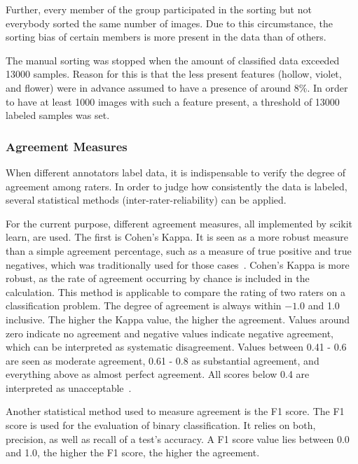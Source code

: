 Further, every member of the group participated in the sorting but not everybody sorted the same number of images. Due to this circumstance, the sorting bias of certain members is more present in the data than of others.

The manual sorting was stopped when the amount of classified data exceeded 13000 samples. Reason for this is that the less present features (hollow, violet, and flower) were in advance assumed to have a presence of around 8\%. In order to have at least 1000 images with such a feature present, a threshold of 13000 labeled samples was set.


\subsubsection{Agreement Measures}
\label{subsec:AgreementMeasures}

When different annotators label data, it is indispensable to verify the degree of agreement among raters. In order to judge how consistently the data is labeled, several statistical methods (inter-rater-reliability) can be applied.

\bigskip
For the current purpose, different agreement measures, all implemented by scikit learn, are used. The first is Cohen’s Kappa. It is seen as a more robust measure than a simple agreement percentage, such as a measure of true positive and true negatives, which was traditionally used for those cases~\citep{cohen1960coefficient}. Cohen’s Kappa is more robust, as the rate of agreement occurring by chance is included in the calculation. This method is applicable to compare the rating of two raters on a classification problem. The degree of agreement is always within $-1.0$ and 1.0 inclusive. The higher the Kappa value, the higher the agreement. Values around zero indicate no agreement and negative values indicate negative agreement, which can be interpreted as systematic disagreement. Values between 0.41 - 0.6 are seen as moderate agreement, 0.61 - 0.8 as substantial agreement, and everything above as almost perfect agreement. All scores below 0.4 are interpreted as unacceptable~\citep{mchugh2012interrater}. 

\bigskip
Another statistical method used to measure agreement is the F1 score. The F1 score is used for the evaluation of binary classification. It relies on both, precision, as well as recall of a test’s accuracy. A F1 score value lies between 0.0 and 1.0, the higher the F1 score, the higher the agreement.

